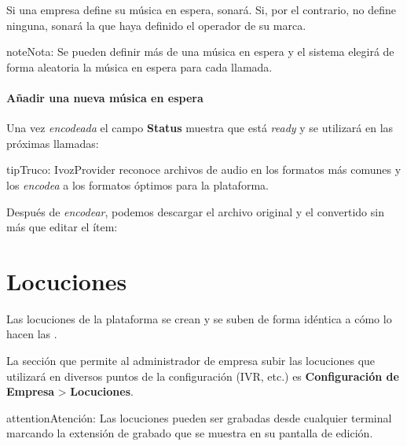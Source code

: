 \documentclass[letterpaper,10pt,spanish]{sphinxmanual}
\begin{document}
Si una empresa define su música en espera, sonará. Si, por el contrario, no define ninguna, sonará la que haya definido el operador de su marca.

\begin{notice}{note}{Nota:}
Se pueden definir más de una música en espera y el sistema elegirá de forma aleatoria la música en espera para cada llamada.
\end{notice}
\paragraph{Añadir una nueva música en espera}

\noindent{}

Una vez \emph{encodeada} el campo \textbf{Status} muestra que está \emph{ready} y se utilizará en las próximas llamadas:

\noindent{}

\begin{notice}{tip}{Truco:}
IvozProvider reconoce archivos de audio en los formatos más comunes y los \emph{encodea} a los formatos óptimos para la plataforma.
\end{notice}

Después de \emph{encodear}, podemos descargar el archivo original y el convertido sin más que editar el ítem:

\noindent{}


\section{Locuciones}
\label{pbx_features/sounds:locutions}\label{pbx_features/sounds::doc}
Las locuciones de la plataforma se crean y se suben de forma idéntica a cómo lo hacen las {\hyperref[pbx_features/music_on_hold:musiconhold]{}}.

La sección que permite al administrador de empresa subir las locuciones que utilizará en diversos puntos de la configuración (IVR, etc.) es \textbf{Configuración de Empresa} \textgreater{} \textbf{Locuciones}.

\noindent{}

\begin{notice}{attention}{Atención:}
Las locuciones pueden ser grabadas desde cualquier terminal marcando la extensión de grabado que se muestra en su pantalla de edición.
\end{notice}
\end{document}
